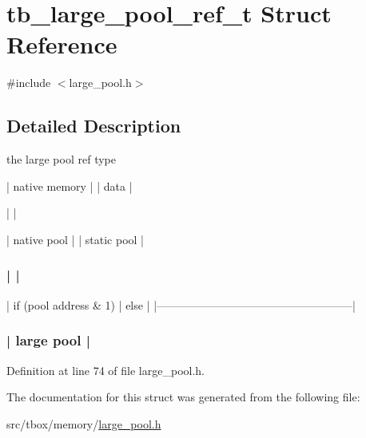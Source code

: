 \hypertarget{structtb__large__pool__ref__t}{\section{tb\-\_\-large\-\_\-pool\-\_\-ref\-\_\-t Struct Reference}
\label{structtb__large__pool__ref__t}
}


{\ttfamily \#include $<$large\-\_\-pool.\-h$>$}



\subsection{Detailed Description}
the large pool ref type


\begin{DoxyPre}\end{DoxyPre}



\begin{DoxyPre}


|       native memory     |    |         data         |



             |                             |



|       native pool       |    |      static pool     |



\subsubsection*{|                             |
}\end{DoxyPre}



\begin{DoxyPre}
|  if (pool address \& 1)     |           else         |
|-----------------------------------------------------|
\subsubsection*{|                       large pool                    |
}\end{DoxyPre}



\begin{DoxyPre}\end{DoxyPre}



\begin{DoxyPre} \end{DoxyPre}
 

Definition at line 74 of file large\-\_\-pool.\-h.



The documentation for this struct was generated from the following file\-:\begin{DoxyCompactItemize}
\item 
src/tbox/memory/\hyperlink{large__pool_8h}{large\-\_\-pool.\-h}\end{DoxyCompactItemize}
